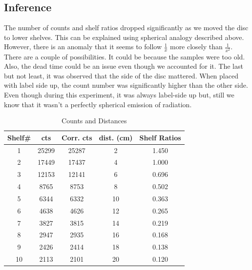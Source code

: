 \documentclass[twocolumn]{article}
\begin{document}
\subsection*{Inference}
The number of counts and shelf ratios dropped significantly as we moved the disc to lower shelves. This can be explained using spherical analogy described above. However, there is an anomaly that it seems to follow $\frac{1}{x}$ more closely than $\frac{1}{x^2}$. There are a couple of possibilities. It could be because the samples were too old. Also, the dead time could be an issue even though we accounted for it. The last but not least, it was observed that the side of the disc mattered. When placed with label side up, the count number was significantly higher than the other side. Even though during this experiment, it was always label-side up but, still we know that it wasn't a perfectly spherical emission of radiation. 
\begin{table}[h!]
  \centering
  \caption{Counts and Distances}
  \begin{tabular}{|c|c|c|c|c|}
    \hline
    \textbf{Shelf\#} & \textbf{cts} & \textbf{Corr. cts} & \textbf{dist. (cm)} & \textbf{Shelf Ratios} \\
    \hline
    1 & 25299 & 25287 & 2 & 1.450 \\
    \hline
    2 & 17449 & 17437 & 4 & 1.000 \\
    \hline
    3 & 12153 & 12141 & 6 & 0.696 \\
    \hline
    4 & 8765 & 8753 & 8 & 0.502 \\
    \hline
    5 & 6344 & 6332 & 10 & 0.363 \\
    \hline
    6 & 4638 & 4626 & 12 & 0.265 \\
    \hline
    7 & 3827 & 3815 & 14 & 0.219 \\
    \hline
    8 & 2947 & 2935 & 16 & 0.168 \\
    \hline
    9 & 2426 & 2414 & 18 & 0.138 \\
    \hline
    10 & 2113 & 2101 & 20 & 0.120 \\
    \hline
  \end{tabular}
  \end{table}
\end{document}
